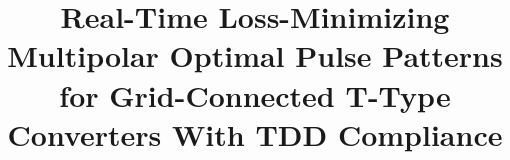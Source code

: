 \documentclass[conference]{IEEEtran}
\begin{document}
\title{
Real-Time Loss-Minimizing Multipolar Optimal Pulse Patterns for
Grid-Connected T-Type Converters With TDD Compliance

}




\maketitle
\end{document}
